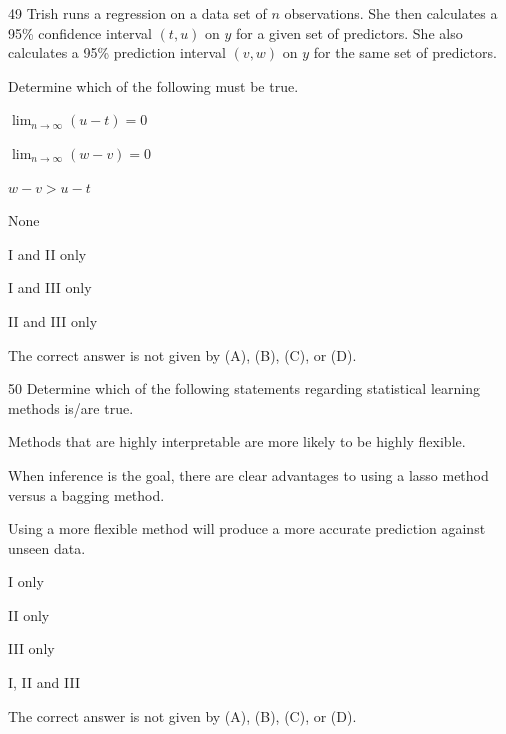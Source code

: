 \begin{question}{49}
Trish runs a regression on a data set of $n$ observations. She then calculates a 95\% confidence interval $(t, u)$ on $y$ for a given set of predictors. She also calculates a 95\% prediction interval $(v, w)$ on $y$ for the same set of predictors.

Determine which of the following must be true.

\begin{statements}
\item $\displaystyle \lim_{n \to \infty} (u - t) = 0$
\item $\displaystyle \lim_{n \to \infty} (w - v) = 0$
\item $w - v > u - t$
\end{statements}

\begin{choices}
\item None
\item I and II only
\item I and III only
\item II and III only
\item The correct answer is not given by (A), (B), (C), or (D).
\end{choices}
\end{question}

\begin{question}{50}
Determine which of the following statements regarding statistical learning methods is/are true.

\begin{statements}
\item Methods that are highly interpretable are more likely to be highly flexible.
\item When inference is the goal, there are clear advantages to using a lasso method versus a bagging method.
\item Using a more flexible method will produce a more accurate prediction against unseen data.
\end{statements}

\begin{choices}
\item I only
\item II only
\item III only
\item I, II and III
\item The correct answer is not given by (A), (B), (C), or (D).
\end{choices}
\end{question}

